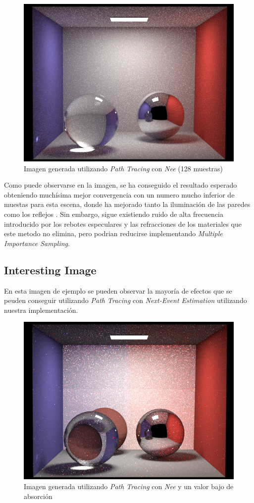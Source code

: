 \documentclass[10pt,oneside,a4paper]{article}
\begin{document}
\begin{figure}[h]
\centering
\includegraphics[width=.6\linewidth]{images/cbox_pathNee_128.png}
\caption{Imagen generada utilizando \textit{Path Tracing} con \textit{Nee} (128 muestras)}
\label{fig:disp}
\end{figure}

Como puede observarse en la imagen, se ha conseguido el resultado esperado obteniendo muchísima mejor convergencia con un numero mucho inferior de muestas para esta escena, donde ha mejorado tanto la iluminación de las paredes como los reflejos . Sin embargo, sigue existiendo ruido de alta frecuencia introducido por los rebotes especulares y las refracciones de los materiales que este metodo no elimina, pero podrian reducirse implementando \textit{Multiple Importance Sampling}.\\
 
 \subsection{Interesting Image}
En esta imagen de ejemplo se pueden observar la mayoría de efectos que se peuden conseguir utilizando \textit{Path Tracing} con \textit{Next-Event Estimation} utilizando nuestra implementación.

\begin{figure}[h]
\centering
\includegraphics[width=.6\linewidth]{images/cbox_interesting_nee_512.png}
\caption{Imagen generada utilizando \textit{Path Tracing} con \textit{Nee} y un valor bajo de absorción}
\label{fig:disp}
\end{figure}
\end{document}
